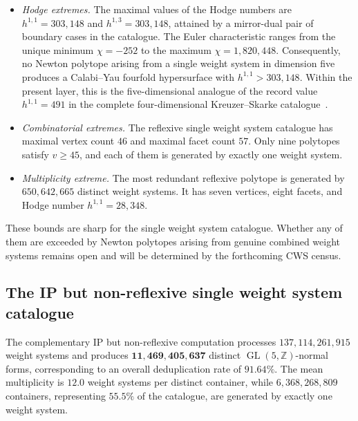 \documentclass[appliedmath,article,submit,moreauthors]{Definitions/mdpi}
\newcommand{\Z}{\mathbb{Z}}
\newcommand{\GL}{\operatorname{GL}}
\begin{document}
\begin{itemize}
    \item \emph{Hodge extremes.} The maximal values of the Hodge numbers are
    \(h^{1,1}=303{,}148\) and \(h^{1,3}=303{,}148\), attained by a mirror-dual
    pair of boundary cases in the catalogue. The Euler characteristic ranges
    from the unique minimum \(\chi=-252\) to the maximum \(\chi=1{,}820{,}448\).
    Consequently, no Newton polytope arising from a single weight system in
    dimension five produces a Calabi--Yau fourfold hypersurface with
    \(h^{1,1}>303{,}148\). Within the present layer, this is the
    five-dimensional analogue of the record value \(h^{1,1}=491\) in the
    complete four-dimensional Kreuzer--Skarke
    catalogue~\cite{KreuzerSkarke2000,KreuzerCYData}.

    \item \emph{Combinatorial extremes.} The reflexive single weight system
    catalogue has maximal vertex count \(46\) and maximal facet count \(57\).
    Only nine polytopes satisfy \(v\geq45\), and each of them is generated by
    exactly one weight system.

    \item \emph{Multiplicity extreme.} The most redundant reflexive polytope is
    generated by \(650{,}642{,}665\) distinct weight systems. It has seven
    vertices, eight facets, and Hodge number \(h^{1,1}=28{,}348\).
\end{itemize}

These bounds are sharp for the single weight system catalogue. Whether any of
them are exceeded by Newton polytopes arising from genuine combined weight
systems remains open and will be determined by the forthcoming CWS census.

\subsection{The IP but non-reflexive single weight system catalogue}
\label{sec:results-ip-nonreflexive}

The complementary IP but non-reflexive computation processes
\(137{,}114{,}261{,}915\) weight systems and produces
\(\mathbf{11{,}469{,}405{,}637}\) distinct \(\GL(5,\Z)\)-normal forms,
corresponding to an overall deduplication rate of \(91.64\%\). The mean
multiplicity is \(12.0\) weight systems per distinct container, while
\(6{,}368{,}268{,}809\) containers, representing \(55.5\%\) of the catalogue,
are generated by exactly one weight system.
\end{document}
